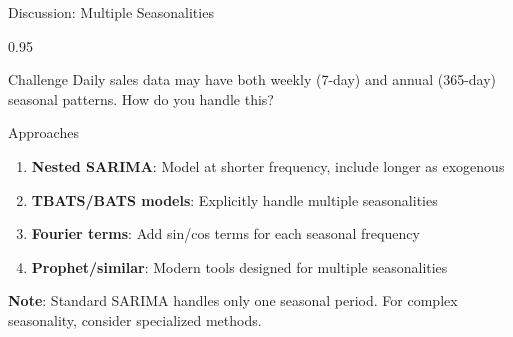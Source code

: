 \documentclass[9pt, aspectratio=169, t]{beamer}
\begin{document}
\begin{frame}{Discussion: Multiple Seasonalities}
    \begin{cminipage}{0.95\textwidth}
    \begin{block}{Challenge}
        Daily sales data may have both weekly (7-day) and annual (365-day) seasonal patterns. How do you handle this?
    \end{block}

    \vspace{0.2cm}

    \begin{block}{Approaches}
        \begin{enumerate}
            \item \textbf{Nested SARIMA}: Model at shorter frequency, include longer as exogenous
            \item \textbf{TBATS/BATS models}: Explicitly handle multiple seasonalities
            \item \textbf{Fourier terms}: Add sin/cos terms for each seasonal frequency
            \item \textbf{Prophet/similar}: Modern tools designed for multiple seasonalities
        \end{enumerate}

        \vspace{0.2cm}
        \textbf{Note}: Standard SARIMA handles only one seasonal period. For complex seasonality, consider specialized methods.
    \end{block}
    \end{cminipage}
\end{frame}
\end{document}
